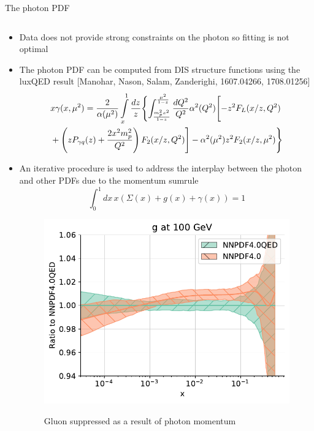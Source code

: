 \documentclass[8pt,t]{beamer}
\begin{document}
\begin{frame}{The photon PDF}
  \begin{columns}
    \begin{column}{0.59\textwidth}
      \begin{itemize}
        \item Data does not provide strong constraints on the photon so fitting is not optimal

        \item The photon PDF can be computed from DIS structure functions using the luxQED result {\color{gray}\footnotesize[Manohar, Nason, Salam, Zanderighi, 1607.04266, 1708.01256]}
        \begin{equation*}
          \begin{split}
            & x \gamma(x, \mu^2)
            =
            \frac{2}{\alpha (\mu^2)} \int\limits_x^1 \frac{dz}{z}
            \Biggl\{ \int_{m_p^2x^2 \over 1-z}^{\mu^2 \over 1-z} \frac{dQ^2}{Q^2}
            \alpha^2(Q^2) \Biggl[ -z^2 F_L(x/z, Q^2) \\
            & + \left( z P_{\gamma q}(z) + \frac{2 x^2 m_p^2}{Q^2} \right)
            F_2(x/z, Q^2)\Biggr] - \alpha^2(\mu^2) z^2 F_2(x/z, \mu^2)\Biggr\}
          \end{split}
        \end{equation*}

        \item An iterative procedure  is used to address the interplay between the photon and other PDFs due to the momentum sumrule
        \begin{equation*}
          \int_0^1 dx\, x \left( \Sigma(x) + g(x) + \gamma(x) \right) =1
        \end{equation*}

        \begin{figure}
          \includegraphics[width=.45\textwidth]{figures/plot_pdfs_g_qed.pdf}\\
          \caption*{Gluon suppressed as a result of photon momentum}
        \end{figure}
      \end{itemize}
    \end{column}


\end{columns}
\end{frame}
\end{document}

